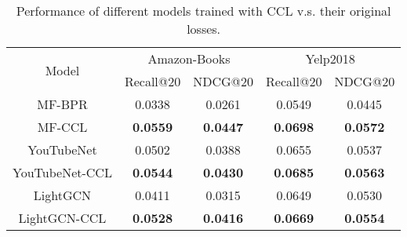 \documentclass[sigconf,authorversion]{acmart}
\begin{document}
\begin{table}[!t]
\caption{Performance of different models trained with CCL v.s. their original losses.}
\centering
\setlength{\tabcolsep}{0.48ex}
\begin{tabular}{c|cc|cc}
\hline
\multirow{2}{*}{Model} & \multicolumn{2}{c|}{Amazon-Books}  & \multicolumn{2}{c}{Yelp2018}  \\ \cline{2-5} 
                       & Recall@20       & NDCG@20         & Recall@20       & NDCG@20               \\ \hline
MF-BPR                 & 0.0338          & 0.0261          & 0.0549          & 0.0445              \\
MF-CCL                 & \textbf{0.0559} & \textbf{0.0447} & \textbf{0.0698} & \textbf{0.0572}  \\ \hline
YouTubeNet         & 0.0502          & 0.0388          & 0.0655         & 0.0537          \\
\hspace{-0.5ex}YouTubeNet-CCL         & \textbf{0.0544} & \textbf{0.0430} & \textbf{0.0685}               &  \textbf{0.0563}                         \\ \hline
LightGCN           & 0.0411          & 0.0315          & 0.0649          & 0.0530          \\
LightGCN-CCL           & \textbf{0.0528} & \textbf{0.0416} & \textbf{0.0669} & \textbf{0.0554}    \\ \hline
\end{tabular}
\label{LightLossCompare}
\end{table}
\end{document}
